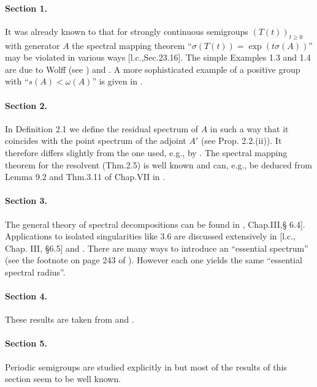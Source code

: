 \paragraph{Section 1.} It was already known to \citet{hillephillips:1957} that for strongly continuous semigroups $(T(t))_{t\geq 0}$ with generator $A$ the spectral mapping theorem \enquote{$\sigma(T(t)) = \exp(t\sigma(A))$} may be violated in various ways [l.c.,Sec.23.16].
The simple Examples 1.3 and 1.4 are due to Wolff (see \citet{greinervoigtwolff:1981}) and \citet{zabczyk:1975}.
A more sophisticated example of a positive group with 
\enquote{$s(A) < \omega(A)$} is given in \citet{wolff:1981}.

\paragraph{Section 2.} In Definition 2.1 we define the residual spectrum of $A$ in such a way that it coincides with the point spectrum of the adjoint $A'$ (see Prop. 2.2.(ii)).
It therefore differs slightly from the one used, e.g., by \citet{schaefer:1974}.
The spectral mapping theorem for the resolvent (Thm.2.5) is well known and can, e.g., be deduced from Lemma 9.2 and Thm.3.11 of Chap.VII in \citet{dunfordschwartz:1958}.

\paragraph{Section 3.} The general theory of spectral decompositions can be found in \citet{kato:1966}, Chap.III,§ 6.4].
Applications to isolated singularities like 3.6 are discussed extensively in [l.c., Chap. III, §6.5] and \citet[Chap.VIII, Sec.8]{yosida:1965}.
There are many ways to introduce an \enquote{essential spectrum} (see the footnote on page 243 of \citet{kato:1966}).
However each one yields the same \enquote{essential spectral radius}.

\paragraph{Section 4.} These results are taken from \citet{derndinger:1980} and \citet{greiner:1981}.

\paragraph{Section 5.} Periodic semigroups are studied explicitly in \citet{bart:1977} but most of the results of this section seem to be well known.

